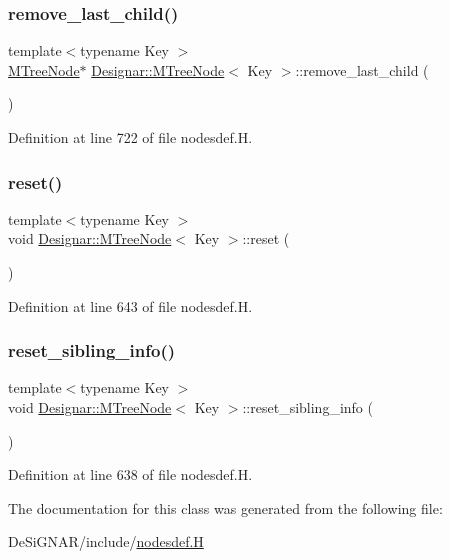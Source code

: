 \subsubsection{\texorpdfstring{remove\+\_\+last\+\_\+child()}{remove\_last\_child()}}
{\footnotesize\ttfamily template$<$typename Key $>$ \\
\hyperlink{class_designar_1_1_m_tree_node}{M\+Tree\+Node}$\ast$ \hyperlink{class_designar_1_1_m_tree_node}{Designar\+::\+M\+Tree\+Node}$<$ Key $>$\+::remove\+\_\+last\+\_\+child (\begin{DoxyParamCaption}{ }\end{DoxyParamCaption})\hspace{0.3cm}{\ttfamily [inline]}}



Definition at line 722 of file nodesdef.\+H.

\mbox{\label{class_designar_1_1_m_tree_node_a83e06dcf705a55bbf7a2963f7d95fdeb}} 
\subsubsection{\texorpdfstring{reset()}{reset()}}
{\footnotesize\ttfamily template$<$typename Key $>$ \\
void \hyperlink{class_designar_1_1_m_tree_node}{Designar\+::\+M\+Tree\+Node}$<$ Key $>$\+::reset (\begin{DoxyParamCaption}{ }\end{DoxyParamCaption})\hspace{0.3cm}{\ttfamily [inline]}}



Definition at line 643 of file nodesdef.\+H.

\mbox{\label{class_designar_1_1_m_tree_node_a7bbcaf3f2dc77eaf4c593e64ca20c5f0}} 
\subsubsection{\texorpdfstring{reset\+\_\+sibling\+\_\+info()}{reset\_sibling\_info()}}
{\footnotesize\ttfamily template$<$typename Key $>$ \\
void \hyperlink{class_designar_1_1_m_tree_node}{Designar\+::\+M\+Tree\+Node}$<$ Key $>$\+::reset\+\_\+sibling\+\_\+info (\begin{DoxyParamCaption}{ }\end{DoxyParamCaption})\hspace{0.3cm}{\ttfamily [inline]}}



Definition at line 638 of file nodesdef.\+H.



The documentation for this class was generated from the following file\+:\begin{DoxyCompactItemize}
\item 
De\+Si\+G\+N\+A\+R/include/\hyperlink{nodesdef_8_h}{nodesdef.\+H}\end{DoxyCompactItemize}
